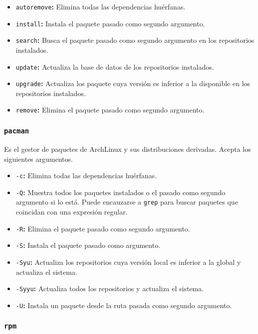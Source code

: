 \begin{itemize}
	\item\texttt{autoremove}\textbf{:} Elimina todas las dependencias huérfanas.
	\item\texttt{install}\textbf{:} Instala el paquete pasado como segundo argumento.
	\item\texttt{search}\textbf{:} Busca el paquete pasado como segundo argumento en los repositorios instalados.
	\item\texttt{update}\textbf{:} Actualiza la base de datos de los repositorios instalados.
	\item\texttt{upgrade}\textbf{:} Actualiza los paquete cuya versión es inferior a la disponible en los repositorios instalados.
	\item\texttt{remove}\textbf{:} Elimina el paquete pasado como segundo argumento.
\end{itemize}

\subsubsection{\texttt{pacman}}

Es el gestor de paquetes de ArchLinux y sus distribuciones derivadas.
Acepta los siguientes argumentos.

\begin{itemize}
	\item\texttt{-c}\textbf{:} Elimina todas las dependencias huérfanas.
	\item\texttt{-Q}\textbf{:} Muestra todos los paquetes instalados o el pasado como segundo argumento si lo está. Puede encauzarse a \texttt{grep} para buscar paquetes que coincidan con una expresión regular.
	\item\texttt{-R}\textbf{:} Elimina el paquete pasado como segundo argumento.
	\item\texttt{-S}\textbf{:} Instala el paquete pasado como argumento.
	\item\texttt{-Syu}\textbf{:} Actualiza los repositorios cuya versión local es inferior a la global y actualiza el sistema.
	\item\texttt{-Syyu}\textbf{:} Actualiza todos los repositorios y actualiza el sistema.
	\item\texttt{-U}\textbf{:} Instala un paquete desde la ruta pasada como segundo argumento.
\end{itemize}

\subsubsection{\texttt{rpm}}

